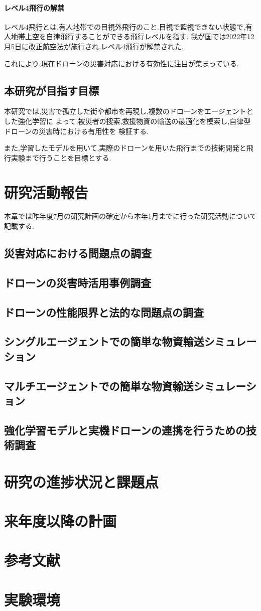 \documentclass{article}[jsarticle]
\begin{document}
\paragraph{レベル4飛行の解禁} \par

レベル4飛行とは,有人地帯での目視外飛行のこと.目視で監視できない状態で,有人地帯上空を自律飛行することができる飛行レベルを指す.
我が国では2022年12月5日に改正航空法が施行され,レベル4飛行が解禁された.\par 
これにより,現在ドローンの災害対応における有効性に注目が集まっている.

\subsection{本研究が目指す目標}
本研究では,災害で孤立した街や都市を再現し,複数のドローンをエージェントとした強化学習に
よって,被災者の捜索,救援物資の輸送の最適化を模索し,自律型ドローンの災害時における有用性を
検証する.\par 
また,学習したモデルを用いて,実際のドローンを用いた飛行までの技術開発と飛行実験まで行うことを目標とする.

\section{研究活動報告}
本章では昨年度7月の研究計画の確定から本年1月までに行った研究活動について記載する.
\subsection{災害対応における問題点の調査}
\subsection{ドローンの災害時活用事例調査}
\subsection{ドローンの性能限界と法的な問題点の調査}
\subsection{シングルエージェントでの簡単な物資輸送シミュレーション}
\subsection{マルチエージェントでの簡単な物資輸送シミュレーション}
\subsection{強化学習モデルと実機ドローンの連携を行うための技術調査}

\section{研究の進捗状況と課題点}

\section{来年度以降の計画}

\section{参考文献}

\section{実験環境}
\end{document}
